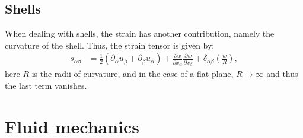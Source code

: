 \documentclass[a4paper]{article}
\begin{document}
\subsection{Shells}
When dealing with shells, the strain has another contribution, namely the curvature of the shell. Thus, the strain tensor is given by:
\begin{align*}
    s_{\alpha\beta} &= \frac{1}{2}\left(\partial_\alpha u_\beta + \partial_\beta u_\alpha\right) + \frac{\partial w}{\partial x_\alpha}\frac{\partial w}{\partial x_\beta} + \delta_{\alpha\beta}\left(\frac{w}{R}\right),
\end{align*}here $R$ is the radii of curvature, and in the case of a flat plane, $R \to\infty$ and thus the last term vanishes.




\section{Fluid mechanics}\label{sec: Fluid mechanics}
\end{document}
